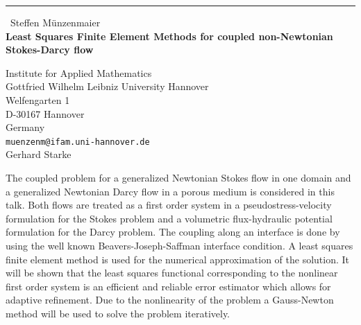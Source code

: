 \documentclass{report}
\begin{document}
\begin{center}
\rule{6in}{1pt} \
{\large Steffen M\"unzenmaier \\
{\bf Least Squares Finite Element Methods for coupled non-Newtonian Stokes-Darcy flow}}

Institute for Applied Mathematics \\ Gottfried Wilhelm Leibniz University Hannover \\ Welfengarten 1 \\ D-30167 Hannover \\ Germany
\\
{\tt muenzenm@ifam.uni-hannover.de}\\
Gerhard Starke\end{center}

The coupled problem for a generalized Newtonian Stokes flow in one domain
and a generalized Newtonian Darcy flow in a porous medium is considered
in this talk. Both flows are treated as a first order system in a
pseudostress-velocity formulation for the Stokes problem and a volumetric
flux-hydraulic potential formulation for the Darcy problem. The coupling
along an interface is done by using the well known Beavers-Joseph-Saffman
interface condition. A least squares finite element method is used for
the numerical approximation of the solution. It will be shown that the
least squares functional corresponding to the nonlinear first order
system is an efficient and reliable error estimator which allows for
adaptive refinement. Due to the nonlinearity of the problem a
Gauss-Newton method will be used to solve the problem iteratively.
\end{document}

